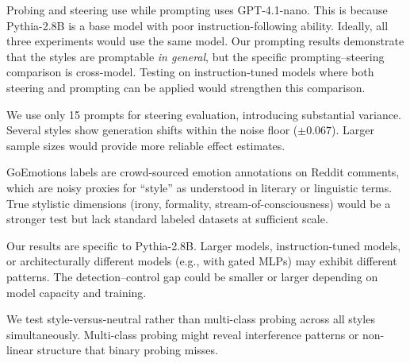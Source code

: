  Probing and steering use \pythia while prompting uses GPT-4.1-nano. This is because Pythia-2.8B is a base model with poor instruction-following ability. Ideally, all three experiments would use the same model. Our prompting results demonstrate that the styles are promptable \emph{in general}, but the specific prompting--steering comparison is cross-model. Testing on instruction-tuned models where both steering and prompting can be applied would strengthen this comparison.

 We use only 15 prompts for steering evaluation, introducing substantial variance. Several styles show generation shifts within the noise floor ($\pm 0.067$). Larger sample sizes would provide more reliable effect estimates.

 GoEmotions labels are crowd-sourced emotion annotations on Reddit comments, which are noisy proxies for ``style'' as understood in literary or linguistic terms. True stylistic dimensions (irony, formality, stream-of-consciousness) would be a stronger test but lack standard labeled datasets at sufficient scale.

 Our results are specific to Pythia-2.8B. Larger models, instruction-tuned models, or architecturally different models (e.g., with gated MLPs) may exhibit different patterns. The detection--control gap could be smaller or larger depending on model capacity and training.

 We test style-versus-neutral rather than multi-class probing across all styles simultaneously. Multi-class probing might reveal interference patterns or non-linear structure that binary probing misses.
